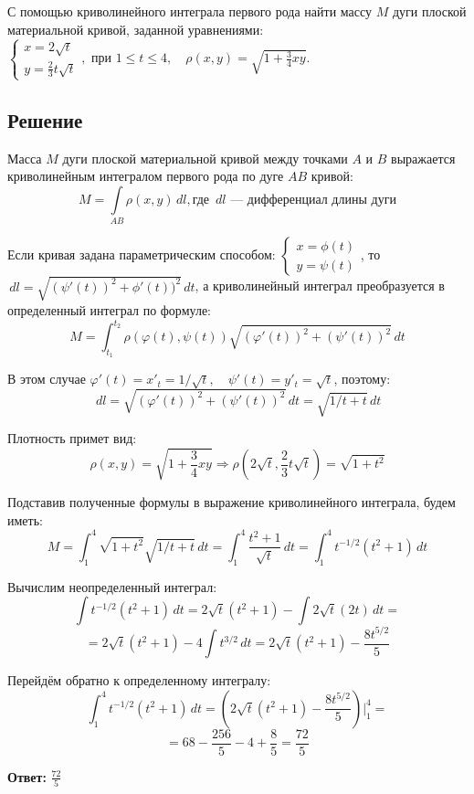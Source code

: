 \documentclass[12pt]{article}
\begin{document}
	С помощью криволинейного интеграла первого рода	найти массу $M$ дуги плоской материальной кривой, заданной уравнениями:			 
		$\begin{cases}
			x = 2\sqrt{t}\\
			y=\frac{2}{3}t\sqrt{t}
		\end{cases},\text{ при }  1 \leq t \leq 4 ,\quad \rho(x,y)=\sqrt{1+\frac{3}{4}xy} .$
	
	
	\subsection*{Решение}
	
	Масса $M$ дуги плоской материальной кривой между точками $A$ и $B$ выражается криволинейным интегралом первого рода по дуге $AB$ кривой:
	$$ M = \int \limits_{AB} \rho (x,y ) \,dl,\text{где $\,dl$ --- дифференциал длины дуги}$$
	
	Если кривая задана параметрическим способом:
	$\begin{cases}
		x = \phi (t)\\
		y = \psi (t)
	\end{cases}$, то $ \,dl =\sqrt{(\psi'(t))^2+\phi'(t))^2}\,dt $, а криволинейный интеграл преобразуется в определенный интеграл по формуле:
	$$ M = \int_{t_1}^{t_2}\rho (\varphi(t),\psi(t))\sqrt{(\varphi'(t))^2+(\psi'(t))^2}\,dt$$ 
	
	В этом случае $ \varphi'(t)= x'_t= 1/\sqrt{t},\quad \psi'(t)= y'_t= \sqrt{t} $, поэтому:
	$$ \,dl=\sqrt{(\varphi'(t))^2+(\psi'(t))^2}\,dt=\sqrt{1/t+t}\,dt $$
	
	Плотность примет вид:	
	$$ \rho(x,y)=\sqrt{1+\frac{3}{4}xy} \Rightarrow \rho(2\sqrt{t}, \frac{2}{3}t\sqrt{t})=\sqrt{1+t^2}$$
	
	Подставив полученные формулы в выражение криволинейного	интеграла, будем иметь:
	$$ M = \int_{1}^{4}\sqrt{1+t^2}\sqrt{1/t+t}\,dt = \int_{1}^{4}\frac{t^2+1}{\sqrt{t}}\,dt  = \int_{1}^{4}t^{-1/2}(t^2+1)\,dt $$ 
	
	Вычислим неопределенный интеграл:
	$$\int t^{-1/2}(t^2+1)\,dt = 2\sqrt{t}(t^2+1) - \int 2\sqrt{t}(2t)\,dt = $$ 
	$$= 2\sqrt{t}(t^2+1) - 4 \int t^{3/2} \,dt = 2\sqrt{t}(t^2+1) -  \frac{8t^{5/2}}{5} $$ 
	
	Перейдём обратно к определенному интегралу:
	$$ \int_{1}^{4}t^{-1/2}(t^2+1)\,dt = (2\sqrt{t}(t^2+1) -  \frac{8t^{5/2}}{5})\Big|_1^{4}=$$ 
	$$= 68 -  \frac{256}{5}-4+  \frac{8}{5}=\frac{72}{5}$$ 
	
	\hspace{290pt}\textbf{Ответ:} $\frac{72}{5}$	
	\newpage
\end{document}
